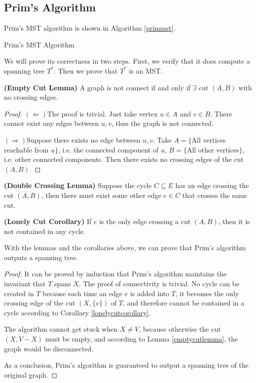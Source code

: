 \subsection{Prim's Algorithm}
Prim's MST algorithm is shown in Algorithm \ref{primmst}. 
\begin{algorithm}[ht]
\caption{Prim's MST Algorithm}\label{primmst}
\begin{algorithmic}[1]
\EndWhile
\end{algorithmic}
\end{algorithm}
We will prove its correctness in two steps. First, we verify that it does compute a spanning tree $T^*$. Then we prove that $T^*$ is an MST. 
\begin{lemma}\textbf{(Empty Cut Lemma)}\label{emptycutlemma}
A graph is not connect if and only if $\exists$ cut $(A,B)$ with no crossing edges.
\end{lemma}
\begin{proof}
$(\Leftarrow)$The proof is trivial. Just take vertex $u\in A$ and $v\in B$. There cannot exist any edges between $u,v$, thus the graph is not connected.

$(\Rightarrow)$Suppose there exists no edge between $u,v$. Take $A=\{$All vertices reachable from $u\}$, i.e. the connected component of $u$, $B=\{$All other vertices$\}$, i.e. other connected components. Then there exists no crossing edges of the cut $(A,B)$.
\end{proof}
\begin{lemma}\label{doublecrossinglemma}
\textbf{(Double Crossing Lemma)}
Suppose the cycle $C\subseteq E$ has an edge crossing the cut $(A,B)$, then there must exist some other edge $e\in C$ that crosses the same cut.
\end{lemma}
\begin{corollary}
\textbf{(Lonely Cut Corollary)}\label{lonelycutcorollary}
If $e$ is the only edge crossing a cut $(A,B)$, then it is not contained in any cycle.
\end{corollary}
With the lemmas and the corollaries above, we can prove that Prim's algorithm outputs a spanning tree.
\begin{proof}
It can be proved by induction that Prim's algorithm maintains the invariant that $T$ spans $X$. The proof of connectivity is trivial. No cycle can be created in $T$ because each time an edge $e$ is added into $T$, it becomes the only crossing edge of the cut $(X,\{v\})$ of $T$, and therefore cannot be contained in a cycle according to Corollary \ref{lonelycutcorollary}. 

The algorithm cannot get stuck when $X\neq V$, because otherwise the cut $(X,V-X)$ must be empty, and according to Lemma \ref{emptycutlemma}, the graph would be disconnected. 

As a conclusion, Prim's algorithm is guaranteed to output a spanning tree of the original graph.
\end{proof}
